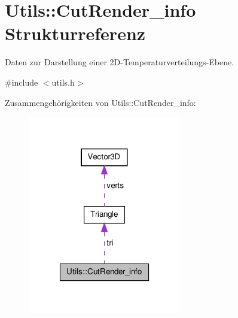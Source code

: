 \hypertarget{structUtils_1_1CutRender__info}{\section{Utils\-:\-:Cut\-Render\-\_\-info Strukturreferenz}
\label{structUtils_1_1CutRender__info}
}


Daten zur Darstellung einer 2\-D-\/\-Temperaturverteilungs-\/\-Ebene.  




{\ttfamily \#include $<$utils.\-h$>$}



Zusammengehörigkeiten von Utils\-:\-:Cut\-Render\-\_\-info\-:\nopagebreak
\begin{figure}[H]
\begin{center}
\leavevmode
\includegraphics[width=190pt]{structUtils_1_1CutRender__info__coll__graph}
\end{center}
\end{figure}
